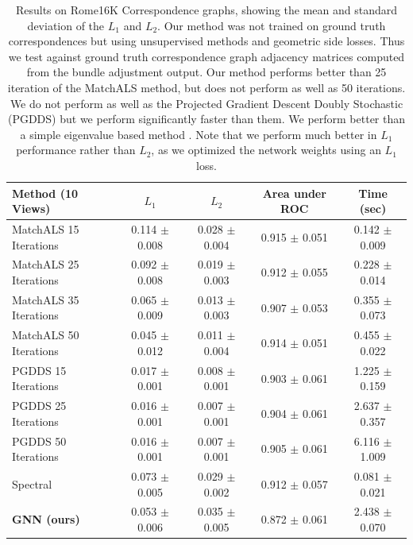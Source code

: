 \documentclass{article} %
\begin{document}
\begin{table}[t]
\begin{center}
\begin{tabular}{|l|c|c|c|c|}
\hline\hline
Method (10 Views)                                   & $L_1$             & $L_2$             & Area under ROC    & Time (sec)        \\
\hline\hline
MatchALS 15 Iterations & 0.114 $\pm$ 0.008 & 0.028 $\pm$ 0.004 & 0.915 $\pm$ 0.051 & 0.142 $\pm$ 0.009 \\ \hline
MatchALS 25 Iterations & 0.092 $\pm$ 0.008 & 0.019 $\pm$ 0.003 & 0.912 $\pm$ 0.055 & 0.228 $\pm$ 0.014 \\ \hline
MatchALS 35 Iterations & 0.065 $\pm$ 0.009 & 0.013 $\pm$ 0.003 & 0.907 $\pm$ 0.053 & 0.355 $\pm$ 0.073 \\ \hline
MatchALS 50 Iterations & 0.045 $\pm$ 0.012 & 0.011 $\pm$ 0.004 & 0.914 $\pm$ 0.051 & 0.455 $\pm$ 0.022 \\ \hline
PGDDS 15 Iterations    & 0.017 $\pm$ 0.001 & 0.008 $\pm$ 0.001 & 0.903 $\pm$ 0.061 & 1.225 $\pm$ 0.159 \\ \hline
PGDDS 25 Iterations    & 0.016 $\pm$ 0.001 & 0.007 $\pm$ 0.001 & 0.904 $\pm$ 0.061 & 2.637 $\pm$ 0.357 \\ \hline
PGDDS 50 Iterations    & 0.016 $\pm$ 0.001 & 0.007 $\pm$ 0.001 & 0.905 $\pm$ 0.061 & 6.116 $\pm$ 1.009 \\ \hline
Spectral               & 0.073 $\pm$ 0.005 & 0.029 $\pm$ 0.002 & 0.912 $\pm$ 0.057 & 0.081 $\pm$ 0.021 \\ \hline
\textbf{GNN (ours)}    & 0.053 $\pm$ 0.006 & 0.035 $\pm$ 0.005 & 0.872 $\pm$ 0.061 & 2.438 $\pm$ 0.070 \\ \hline

\end{tabular}
\end{center}

\caption{
Results on Rome16K Correspondence graphs, showing the mean and standard deviation of the $L_1$ and $L_2$.
Our method was not trained on ground truth correspondences but using unsupervised methods and geometric side losses.
Thus we test against ground truth correspondence graph adjacency matrices computed from the bundle adjustment output.
Our method performs better than 25 iteration of the MatchALS \cite{zhou2015multi} method, but does not perform as well as 50 iterations.
We do not perform as well as the Projected Gradient Descent Doubly Stochastic (PGDDS) \cite{leonardos2016distributed} but we perform significantly faster than them.
We perform better than a simple eigenvalue based method \cite{pachauri2013solving}.
Note that we perform much better in $L_1$ performance rather than $L_2$, as we optimized the network weights using an $L_1$ loss.
}
\label{tab:rome16ktab}
\end{table}
\end{document}
